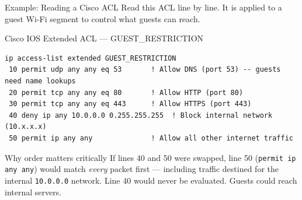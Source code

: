\documentclass[aspectratio=169]{beamer}  %
\begin{document}
\begin{frame}[fragile]{Example: Reading a Cisco ACL}
    \footnotesize
    Read this ACL line by line. It is applied to a guest Wi-Fi segment to control what guests can reach.

    \begin{exampleblock}{Cisco IOS Extended ACL --- GUEST\_RESTRICTION}
        \scriptsize
\begin{verbatim}
ip access-list extended GUEST_RESTRICTION
 10 permit udp any any eq 53       ! Allow DNS (port 53) -- guests need name lookups
 20 permit tcp any any eq 80       ! Allow HTTP (port 80)
 30 permit tcp any any eq 443      ! Allow HTTPS (port 443)
 40 deny ip any 10.0.0.0 0.255.255.255  ! Block internal network (10.x.x.x)
 50 permit ip any any              ! Allow all other internet traffic
\end{verbatim}
    \end{exampleblock}

    \begin{alertblock}{Why order matters critically}
        \footnotesize
        If lines 40 and 50 were swapped, line 50 (\texttt{permit ip any any}) would match \emph{every} packet first --- including traffic destined for the internal \texttt{10.0.0.0} network. Line 40 would never be evaluated. Guests could reach internal servers.
    \end{alertblock}
\end{frame}
\end{document}
